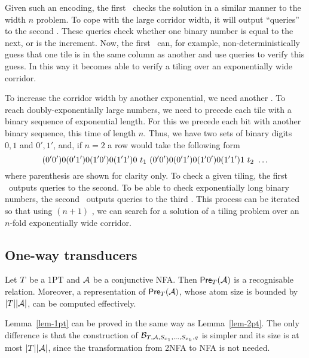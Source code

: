 Given such an encoding, the first \FFT\ checks the solution in a similar manner to the width $n$ problem.
To cope with the large corridor width, it will output ``queries'' to the second \FFT.
These queries check whether one binary number is equal to the next, or is the increment.
Now, the first \FFT\ can, for example, non-deterministically guess that one tile is in the same column as another and use queries to verify this guess.
In this way it becomes able to verify a tiling over an exponentially wide corridor.

To increase the corridor width by another exponential, we need another \FFT.
To reach doubly-exponentially large numbers, we need to precede each tile with a binary sequence of exponential length.
For this we precede each bit with another binary sequence, this time of length $n$.
Thus, we have two sets of binary digits $0,1$ and $0', 1'$, and, if $n = 2$ a row would take the following form
\[
    (0'0') 0 (0'1') 0 (1'0') 0 (1'1') 0\ \tile_1\ %
    (0'0') 0 (0'1') 0 (1'0') 0 (1'1') 1\ \tile_2\ %
    \ldots 
\]
where parenthesis are shown for clarity only.
To check a given tiling, the first \FFT\ outputs queries to the second.
To be able to check exponentially long binary numbers, the second \FFT\ outputs queries to the third \FFT.
This process can be iterated so that using $(n+1)$ \FFT, we can search for a solution of a tiling problem over an $n$-fold exponentially wide corridor.




\subsection{One-way transducers}


\begin{lemma}\label{lem-1pt}
Let $T$ be a 1PT and $\mathcal{A}$ be a conjunctive NFA. Then $\textsf{Pre}_{T}(\mathcal{A})$ is a recognisable relation. Moreover, a representation of $\textsf{Pre}_{T}(\mathcal{A})$, whose atom size is bounded by $|T||\mathcal{A}|$, can be computed effectively.
\end{lemma}

Lemma~\ref{lem-1pt} can be proved in the same way as Lemma~\ref{lem-2pt}. The only difference is that the construction of $\mathcal{B}_{T, \mathcal{A}, S_{x_1}, \ldots, S_{x_k}, q}$ is simpler and its size is at most $|T| |\mathcal{A}|$, since the transformation from  2NFA to NFA is not needed.

